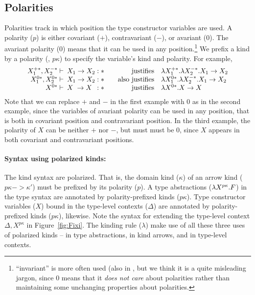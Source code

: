 \subsection{Polarities} \label{ssec:fixi:def:polarity}
Polarities track in which position the type constructor variables are used.
A polarity ($p$) is either covariant ($+$), contravariant ($-$), or
avariant ($0$). The avariant polarity ($0$) means that it can be used in
any position.\footnote{``invariant'' is more often used
	(also in \cite{AbeMat04}, but we think it is a quite misleading jargon,
	since $0$ means that it \emph{does not care} about polarities
	rather than maintaining some unchanging properties about polarities.}
We prefix a kind  by a polarity (\ie, $p\kappa$) to specify the variable's
kind and polarity. For example,
\[
\begin{array}{rlrl}
X_1^{+*},X_2^{-*} |- \!\!\! & X_1 -> X_2 : *
	& ~~~\text{justifies} & \l X_1^{+*}.\l X_2^{-*}.X_1 -> X_2 \\
X_1^{0*},X_2^{0*} |- \!\!\! & X_1 -> X_2 : *
	& ~~~\text{also justifies} & \l X_1^{0*}.\l X_2^{-*}.X_1 -> X_2 \\
X^{0*} |- \!\!\! & X\phantom{_.} -> X\phantom{_2} : *
	& ~~~\text{justifies} & \l X^{0*}.X -> X
\end{array}
\]
Note that we can replace $+$ and $-$ in the first example with $0$
as in the second example, since the variables of avariant polarity can be used
in any position, that is both in covariant position and contravariant position.
In the third example, the polarity of $X$ can be neither $+$ nor $-$, but must
must be $0$, since $X$ appears in both covariant and contravariant positions.

\paragraph{Syntax using polarized kinds:}
The kind syntax are polarized. That is, the domain kind ($\kappa$) of
an arrow kind ($p\kappa -> \kappa'$) must be prefixed by its polarity ($p$).
A type abstractions ($\lambda X^{p\kappa}.F$) in the type syntax are annotated by
polarity-prefixed kinds ($p\kappa$). Type constructor variables ($X$) bound
in the type-level contexts ($\Delta$) are annotated by polarity-prefixed kinds
($p\kappa$), likewise. Note the syntax for extending the type-level context
$\Delta,X^{p\kappa}$ in Figure~\ref{fig:Fixi}. The kinding rule ($\lambda$)
make use of all these three uses of polarized kinds -- in type abstractions,
in kind arrows, and in type-level contexts.

